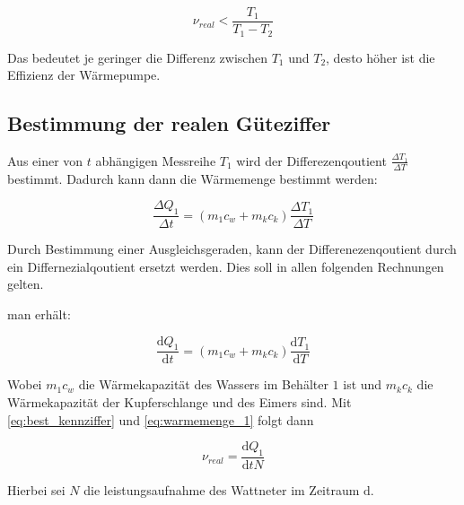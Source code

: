 \begin{equation*}
\nu_{real}<\frac{T_1}{T_1-T_2}
\end{equation*}

Das bedeutet je geringer die Differenz zwischen $T_1$ und $T_2$, 
desto höher ist die Effizienz der Wärmepumpe.

\subsection{Bestimmung der realen Güteziffer}
Aus einer von $t$ abhängigen Messreihe $T_1$ wird der Differezenqoutient $\frac{\Delta T_1}{\Delta T}$ bestimmt.
Dadurch kann dann die Wärmemenge bestimmt werden:

\begin{equation*}
\frac{\Delta Q_1}{\Delta t}=\left(m_1c_w+m_kc_k\right)\frac{\Delta T_1}{\Delta T}
\end{equation*}

Durch Bestimmung einer Ausgleichsgeraden, kann der 
Differenezenqoutient durch ein Differnezialqoutient
ersetzt werden.
Dies soll in allen folgenden Rechnungen gelten.

man erhält:

\begin{equation}
\label{eq:warmemenge_1}
\frac{\mathup{d} Q_1}{\mathup{d} t}=\left(m_1c_w+m_kc_k\right)\frac{\mathup{d} T_1}{\mathup{d} T}
\end{equation}


Wobei $m_1c_w$ die Wärmekapazität des Wassers im Behälter $1$ ist und 
$m_kc_k$ die Wärmekapazität der Kupferschlange und des Eimers sind.
Mit \eqref{eq:best_kennziffer} und \eqref{eq:warmemenge_1} folgt dann

\begin{equation}
\label{eq:bestimmung_ziffer}
\nu_{real}=\frac{\mathup{d}Q_1}{\mathup{d}tN}
\end{equation}

Hierbei sei $N$ die leistungsaufnahme des Wattneter im Zeitraum $\mathup{d}$.



